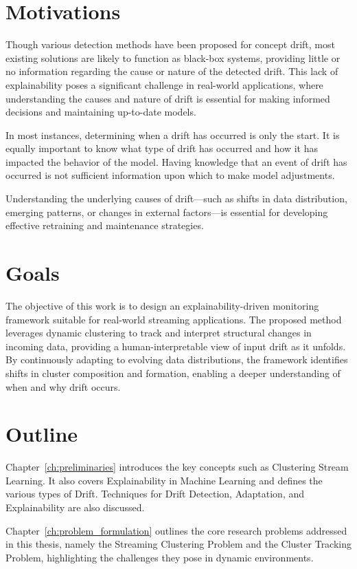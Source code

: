 \section{Motivations}\label{sec:motivations}
Though various detection methods have been proposed for concept drift, most
existing solutions are likely to function as black-box systems, providing
little or no information regarding the cause or nature of the detected drift.
This lack of explainability poses a significant challenge in real-world
applications, where understanding the causes and nature of drift is essential
for making informed decisions and maintaining up-to-date models.

In most instances, determining when a drift has occurred is only the start. It
is equally important to know what type of drift has occurred and how it has
impacted the behavior of the model. Having knowledge that an event of drift has
occurred is not sufficient information upon which to make model adjustments.

Understanding the underlying causes of drift—such as shifts in data
distribution, emerging patterns, or changes in external factors—is essential
for developing effective retraining and maintenance strategies.

\section{Goals}\label{sec:goal}
The objective of this work is to design an explainability-driven monitoring
framework suitable for real-world streaming applications. The proposed method
leverages dynamic clustering to track and interpret structural changes in
incoming data, providing a human-interpretable view of input drift as it
unfolds. By continuously adapting to evolving data distributions, the framework
identifies shifts in cluster composition and formation, enabling a deeper
understanding of when and why drift occurs.

\section{Outline}\label{sec:outline}
Chapter~\ref{ch:preliminaries} introduces the key concepts such as Clustering
Stream Learning. It also covers Explainability in Machine Learning and defines
the various types of Drift. Techniques for Drift Detection, Adaptation, and
Explainability are also discussed.

Chapter~\ref{ch:problem_formulation} outlines the core research problems
addressed in this thesis, namely the Streaming Clustering Problem and the
Cluster Tracking Problem, highlighting the challenges they pose in dynamic
environments.

